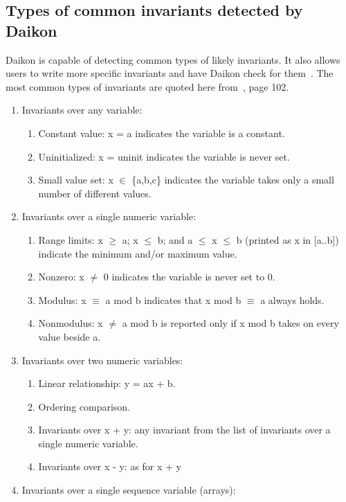 \subsection{Types of common invariants detected by Daikon}
Daikon is capable of detecting common types of likely invariants. It also allows users to write more specific invariants and have Daikon check for them~\cite{ernst2001dynamically}.
The most common types of invariants are quoted here from~\cite{ernst2001dynamically}, page 102. 
\begin{enumerate}
\item Invariants over any variable: 
	\begin{enumerate}
	 \item Constant value: x = a indicates the variable is a constant.
	 \item Uninitialized: x = uninit indicates the variable is never set.
	 \item Small value set: x $\in$ \{a,b,c\} indicates the variable takes only a small number of different values.
	\end{enumerate}
\item Invariants over a single numeric variable: 
	\begin{enumerate}
	\item Range limits: x $\ge$ a; x $\le$ b; and a $\le$ x $\le$ b (printed as x in [a..b]) indicate the minimum and/or maximum value.
	\item Nonzero: x $\ne$ 0 indicates the variable is never set to 0. 
	\item Modulus: x $\equiv$ a mod b indicates that x mod b $\equiv$ a always holds.
	\item Nonmodulus: x $\ne$ a mod b is reported only if x mod b takes on every value beside a.
	\end{enumerate}
\item Invariants over two numeric variables: 
	\begin{enumerate}
	\item Linear relationship: y = ax + b. 
	\item Ordering comparison. 
	\item Invariants over x + y: any invariant from the list of invariants over a single numeric variable.
	\item Invariants over x - y: as for x + y
	\end{enumerate}
\item Invariants over a single sequence variable (arrays): 
	\begin{enumerate}

\end{enumerate}
\end{enumerate}
